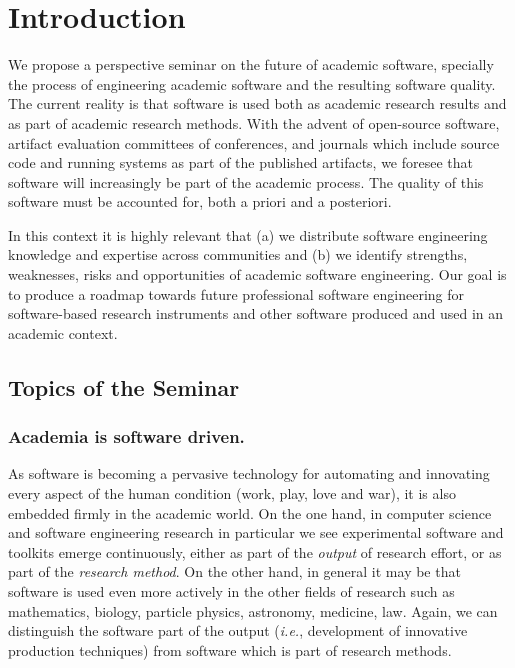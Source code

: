 \documentclass[a4paper,UKenglish]{dagman}
\renewcommand{\paragraph}[1]{\subsubsection*{#1}\xspace}
\newcommand{\ie}{\emph{i.e.},\xspace}
\begin{document}
\tableofcontents

\section{Introduction}


We propose a perspective seminar on the future of academic software, specially the process of engineering academic software and the resulting software quality. The current reality is that software is used both as academic research results and as part of academic research methods. With the advent of open-source software, artifact evaluation committees of conferences, and journals which include source code and running systems as part of the published artifacts, we foresee that software will increasingly be part of the academic process. The quality of this software must be accounted for, both a priori and a posteriori.

In this context it is highly relevant that (a) we distribute software engineering knowledge and expertise across communities and (b) we identify  strengths, weaknesses, risks and opportunities of academic software engineering. Our goal is to produce a roadmap towards future professional software engineering for software-based research instruments and other software produced and used in an academic context.


\subsection*{Topics of the Seminar}

\paragraph{Academia is software driven.} As software is becoming a pervasive technology for automating and innovating every aspect of the human condition (work, play, love and war), it is also embedded firmly in the academic world. On the one hand, in computer science and software engineering research in particular we see experimental software and toolkits emerge continuously, either as part of the \emph{output} of research effort, or as part of the \emph{research method}. On the other hand, in general it may be that software is used even more actively in the other fields of research such as mathematics, biology, particle physics, astronomy, medicine, law. Again, we can distinguish the software part of the output (\ie development of innovative production techniques) from software which is part of research methods. 
\end{document}
